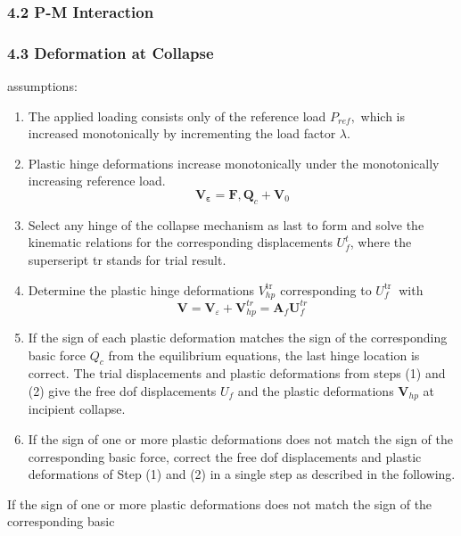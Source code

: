\hypertarget{p-m-interaction}{%
\subsubsection{4.2 P-M Interaction}\label{p-m-interaction}}

\hypertarget{deformation-at-collapse}{%
\subsubsection{4.3 Deformation at
Collapse}\label{deformation-at-collapse}}

assumptions:

\begin{enumerate}
\def\labelenumi{\arabic{enumi})}
\item
  The applied loading consists only of the reference load \(P_{r e f},\)
  which is increased monotonically by incrementing the load factor
  \(\lambda\).
\item
  Plastic hinge deformations increase monotonically under the
  monotonically increasing reference load. \[
   \boldsymbol{V}_{\boldsymbol{\varepsilon}}=\mathbf{F}, \boldsymbol{Q}_{c}+\boldsymbol{V}_{0}
   \]
\item
  Select any hinge of the collapse mechanism as last to form and solve
  the kinematic relations for the corresponding displacements
  \(U_{f}^{t}\), where the superseript tr stands for trial result.
\item
  Determine the plastic hinge deformations \(V_{h p}^{\text {tr }}\)
  corresponding to \(U_{f}^{\text {tr }}\) with \[
   \boldsymbol{V}=\boldsymbol{V}_{\varepsilon}+\boldsymbol{V}_{h p}^{t r}=\mathbf{A}_{f} \boldsymbol{U}_{f}^{t r}
   \]
\item
  If the sign of each plastic deformation matches the sign of the
  corresponding basic force \(Q_{c}\) from the equilibrium equations,
  the last hinge location is correct. The trial displacements and
  plastic deformations from steps (1) and (2) give the free dof
  displacements \(U_{f}\) and the plastic deformations
  \(\boldsymbol{V}_{h p}\) at incipient collapse.
\item
  If the sign of one or more plastic deformations does not match the
  sign of the corresponding basic force, correct the free dof
  displacements and plastic deformations of Step (1) and (2) in a single
  step as described in the following.
\end{enumerate}

If the sign of one or more plastic deformations does not match the sign
of the corresponding basic

